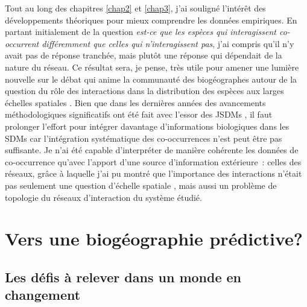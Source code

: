 Tout au long des chapitres \ref{chap2} et \ref{chap3}, j'ai souligné
l'intérêt des développements théoriques pour mieux comprendre les
données empiriques. En partant initialement de la question \emph{est-ce
que les espèces qui interagissent co-occurrent différemment que celles
qui n'interagissent pas}, j'ai compris qu'il n'y avait pas de réponse
tranchée, mais plutôt une réponse qui dépendait de la nature du réseau.
Ce résultat sera, je pense, très utile pour amener une lumière nouvelle
sur le débat qui anime la communauté des biogéographes autour de la
question du rôle des interactions dans la distribution des espèces aux
larges échelles spatiales \citep{Araujo2014, Godsoe2015}. Bien que dans
les dernières années des avancements méthodologiques significatifs ont
été fait avec l'essor des JSDMs
\citep{Ovaskainen2010, Pollock2014, Warton2015b}, il faut prolonger
l'effort pour intégrer davantage d'informations biologiques dans les
SDMs car l'intégration systématique des co-occurrences n'est peut être
pas suffisante. Je n'ai été capable d'interpréter de manière cohérente
les données de co-occurrence qu'avec l'apport d'une source d'information
extérieure~: celles des réseaux, grâce à laquelle j'ai pu montré que
l'importance des interactions n'était pas seulement une question
d'échelle spatiale \citep{Araujo2014, Belmaker2015}, mais aussi un
problème de topologie du réseaux d'interaction du système étudié.

\section*{Vers une biogéographie
prédictive?}\label{vers-une-bioguxe9ographie-pruxe9dictive}

\subsection*{Les défis à relever dans un monde en
changement}\label{les-duxe9fis-uxe0-relever-dans-un-monde-en-changement}

